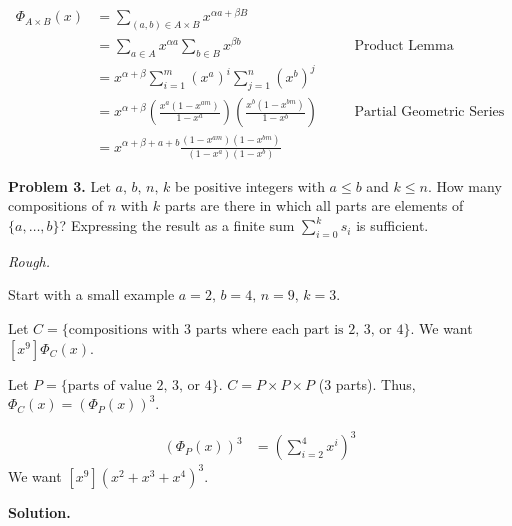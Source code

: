 \[
    \begin{aligned}
        \Phi_{A\times B}(x)
         & =\sum\limits_{(a,b)\in A\times B}x^{\alpha a+\beta B}                                                                                              \\
         & =\sum\limits_{a\in A}x^{\alpha a}\sum\limits_{b\in B}x^{\beta b}                                         & \quad & \text{Product Lemma}            \\
         & =x^{\alpha+\beta} \sum\limits_{i=1}^{m} (x^a)^i \sum\limits_{j=1}^{n} (x^b)^j                                                                      \\
         & =x^{\alpha+\beta}\left( \frac{x^a(1-x^{am})}{1-x^a}  \right) \left( \frac{x^b(1-x^{bm})}{1-x^b}  \right) &       & \text{Partial Geometric Series} \\
         & =x^{\alpha + \beta + a + b} \frac{(1-x^{am})(1-x^{bm})}{(1-x^a)(1-x^b)}
    \end{aligned}
\]


\textbf{Problem 3.} Let $ a,\,b,\,n,\,k $ be positive integers with $ a\le b $
and $ k\le n $. How many compositions of $ n $ with $ k $ parts are there in which
all parts are elements of $ \{a,\ldots ,b\} $? Expressing the result as a finite
sum $ \sum\limits_{i=0}^{k} s_i $ is sufficient.

\emph{Rough.}

Start with a small example $ a=2,\,b=4,\,n=9,\,k=3 $.

Let $ C=\{\text{compositions with 3 parts where each part is 2, 3, or 4}\} $.
We want $ [x^9]\Phi_C(x) $.

Let $ P=\{\text{parts of value 2, 3, or 4}\} $. $ C=P\times P \times P $ (3 parts).
Thus, $ \Phi_C(x)=(\Phi_P(x))^3 $.

\begin{align*}
    (\Phi_P(x))^3 & =\left( \sum\limits_{i=2}^{4} x^i \right)^3
\end{align*}
We want $ [x^9](x^2+x^3+x^4)^3 $.

\textbf{Solution.}

